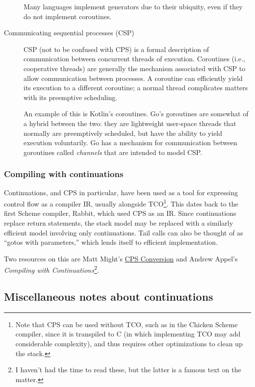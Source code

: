 \documentclass[]{article}
\begin{document}
\begin{description}
  Many languages implement generators due to their ubiquity, even if they do not implement coroutines.
\item[Communicating sequential processes (CSP)] CSP (not to be confused with CPS) is a formal description of communication between concurrent threads of execution. Coroutines (i.e., cooperative threads) are generally the mechanism associated with CSP to allow communication between processes. A coroutine can efficiently yield its execution to a different coroutine; a normal thread complicates matters with its preemptive scheduling.

An example of this is Kotlin's coroutines. Go's goroutines are somewhat of a hybrid between the two: they are lightweight user-space threads that normally are preemptively scheduled, but have the ability to yield execution voluntarily. Go has a mechanism for communication between goroutines called \textit{channels} that are intended to model CSP.
\end{description}

\subsubsection{Compiling with continuations}
\label{sec:comp}

Continuations, and CPS in particular, have been used as a tool for expressing control flow as a compiler IR, usually alongside TCO\footnote{Note that CPS can be used without TCO, such as in the Chicken Scheme compiler, since it is transpiled to C (in which implementing TCO may add considerable complexity), and thus requires other optimizations to clean up the stack.}. This dates back to the first Scheme compiler, Rabbit, which used CPS as an IR. Since continuations replace return statements, the stack model may be replaced with a similarly efficient model involving only continuations. Tail calls can also be thought of as ``gotos with parameters,'' which lends itself to efficient implementation.

Two resources on this are Matt Might's \href{https://matt.might.net/articles/cps-conversion/}{CPS Conversion} and Andrew Appel's \textit{Compiling with Continuations}\footnote{I haven't had the time to read these, but the latter is a famous text on the matter.}.

\subsection{Miscellaneous notes about continuations}
\label{sec:misc}
\end{document}

